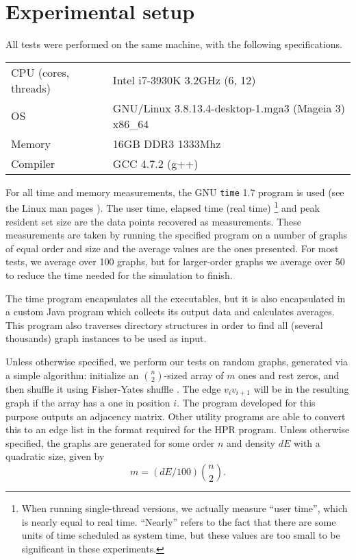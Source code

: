 \documentclass{cslthse-msc}
\newcommand{\code}{\texttt}
\newcommand{\density}{dE}
\begin{document}
\section{Experimental setup}
All tests were performed on the same machine, with the following specifications.

\begin{center}
\begin{tabular}{l|l}
CPU (cores, threads) & Intel i7-3930K 3.2GHz (6, 12) \\ 
OS & GNU/Linux 3.8.13.4-desktop-1.mga3 (Mageia 3) x86\_64 \\ 
Memory & 16GB DDR3 1333Mhz \\ 
Compiler & GCC 4.7.2 (g++) \\ 
\end{tabular}
\end{center}

For all time and memory measurements, the GNU \code{time} 1.7 program is used (see the Linux man pages \cite{time}). The user time, elapsed time (real time)
\footnote{When running single-thread versions, we actually measure ``user time'', which is nearly equal to real time. ``Nearly'' refers to the fact that there are some units of time scheduled as system time, but these values are too small to be significant in these experiments.}
and peak resident set size are the data points recovered as measurements. These measurements are taken by running the specified program on a number of graphs of equal order and size and the average values are the ones presented. For most tests, we average over 100 graphs, but for larger-order graphs we average over 50 to reduce the time needed for the simulation to finish.

The time program encapsulates all the executables, but it is also encapsulated in a custom Java program which collects its output data and calculates averages. This program also traverses directory structures in order to find all (several thousands) graph instances to be used as input.

Unless otherwise specified, we perform our tests on random graphs, generated via a simple algorithm: initialize an $\binom{n}{2}$-sized array of $m$ ones and rest zeros, and then shuffle it using Fisher-Yates shuffle \cite[p. 145]{knuth2}. The edge $v_iv_{i+1}$ will be in the resulting graph if the array has a one in position $i$. The program developed for this purpose outputs an adjacency matrix. Other utility programs are able to convert this to an edge list in the format required for the HPR program. Unless otherwise specified, the graphs are generated for some order $n$ and density $\density{}$ with a quadratic size, given by
\[ m = (\density{} / 100) \binom{n}{2}.\]
\end{document}

